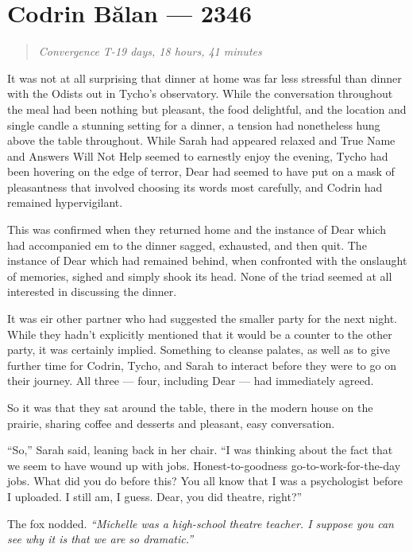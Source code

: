 \hypertarget{codrin-bux103lan-2346}{%
\chapter{Codrin Bălan — 2346}\label{codrin-bux103lan-2346}}

\begin{quote}
\emph{Convergence T-19 days, 18 hours, 41 minutes}
\end{quote}

It was not at all surprising that dinner at home was far less stressful than dinner with the Odists out in Tycho's observatory. While the conversation throughout the meal had been nothing but pleasant, the food delightful, and the location and single candle a stunning setting for a dinner, a tension had nonetheless hung above the table throughout. While Sarah had appeared relaxed and True Name and Answers Will Not Help seemed to earnestly enjoy the evening, Tycho had been hovering on the edge of terror, Dear had seemed to have put on a mask of pleasantness that involved choosing its words most carefully, and Codrin had remained hypervigilant.

This was confirmed when they returned home and the instance of Dear which had accompanied em to the dinner sagged, exhausted, and then quit. The instance of Dear which had remained behind, when confronted with the onslaught of memories, sighed and simply shook its head. None of the triad seemed at all interested in discussing the dinner.

It was eir other partner who had suggested the smaller party for the next night. While they hadn't explicitly mentioned that it would be a counter to the other party, it was certainly implied. Something to cleanse palates, as well as to give further time for Codrin, Tycho, and Sarah to interact before they were to go on their journey. All three — four, including Dear — had immediately agreed.

So it was that they sat around the table, there in the modern house on the prairie, sharing coffee and desserts and pleasant, easy conversation.

``So,'' Sarah said, leaning back in her chair. ``I was thinking about the fact that we seem to have wound up with jobs. Honest-to-goodness go-to-work-for-the-day jobs. What did you do before this? You all know that I was a psychologist before I uploaded. I still am, I guess. Dear, you did theatre, right?''

The fox nodded. \emph{``Michelle was a high-school theatre teacher. I suppose you can see why it is that we are so dramatic.''}

